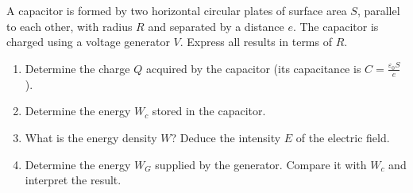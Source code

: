 \documentclass[12pt]{article}
\begin{document}
\begin{correctionbox}

\end{correctionbox}

\section{}
A capacitor is formed by two horizontal circular plates of surface area $ S $, parallel to each other, with radius $ R $ and separated by a distance $ e $. The capacitor is charged using a voltage generator $ V $. Express all results in terms of $ R $.
\begin{enumerate}
	\item Determine the charge $ Q $ acquired by the capacitor (its capacitance is $ C = \frac{\varepsilon_0 S}{e} $).
	\item Determine the energy $ W_c $ stored in the capacitor.
	\item What is the energy density $ W $? Deduce the intensity $ E $ of the electric field.
	\item Determine the energy $ W_G $ supplied by the generator. Compare it with $ W_c $ and interpret the result.
\end{enumerate}


\begin{correctionbox}

\end{correctionbox}
\end{document}
